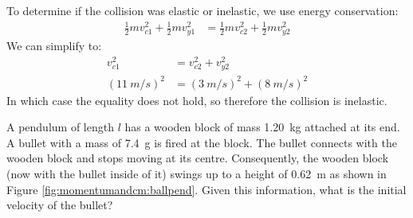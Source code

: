 \begin{solution}
\begin{parts}
To determine if the collision was elastic or inelastic, we use energy conservation:
\begin{align*}
\frac{1}{2}m v_{c1}^2 + \frac{1}{2}m v_{y1}^2 &= \frac{1}{2}m v_{c2}^2 + \frac{1}{2}m v_{y2}^2
\end{align*}
We can simplify to:
\begin{align*}
v_{c1}^2 &= v_{c2}^2 + v_{y2}^2 \\
(\SI{11}{m/s})^2 &= (\SI{3}{m/s})^2 + (\SI{8}{m/s})^2
\end{align*}
In which case the equality does not hold, so therefore the collision is inelastic. 
\end{parts}
\end{solution}


\question A pendulum of length $l$ has a wooden block of mass \SI{1.20}{kg} attached at its end. A bullet with a mass of \SI{7.4}{g} is fired at the block. The bullet connects with the wooden block and stops moving at its centre. Consequently, the wooden block (now with the bullet inside of it) swings up to a height of \SI{0.62}{m} as shown in Figure \ref{fig:momentumandcm:ballpend}. Given this information, what is the initial velocity of the bullet?


